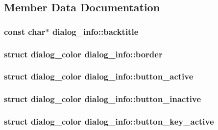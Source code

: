 \subsection{Member Data Documentation}
\hypertarget{structdialog__info_a9f1a0fbe65d687a77b55de0838aded99}{
\subsubsection[{backtitle}]{\setlength{\rightskip}{0pt plus 5cm}const char$\ast$ dialog\-\_\-info\-::backtitle}}\label{structdialog__info_a9f1a0fbe65d687a77b55de0838aded99}
\hypertarget{structdialog__info_a4d23511fa929b3c50042cce4044a56ed}{
\subsubsection[{border}]{\setlength{\rightskip}{0pt plus 5cm}struct {\bf dialog\-\_\-color} dialog\-\_\-info\-::border}}\label{structdialog__info_a4d23511fa929b3c50042cce4044a56ed}
\hypertarget{structdialog__info_afbdc441019b4745607c4fbca304b69f4}{
\subsubsection[{button\-\_\-active}]{\setlength{\rightskip}{0pt plus 5cm}struct {\bf dialog\-\_\-color} dialog\-\_\-info\-::button\-\_\-active}}\label{structdialog__info_afbdc441019b4745607c4fbca304b69f4}
\hypertarget{structdialog__info_a93ea9a7c783c4b085247fd774381ef8c}{
\subsubsection[{button\-\_\-inactive}]{\setlength{\rightskip}{0pt plus 5cm}struct {\bf dialog\-\_\-color} dialog\-\_\-info\-::button\-\_\-inactive}}\label{structdialog__info_a93ea9a7c783c4b085247fd774381ef8c}
\hypertarget{structdialog__info_a29a8048b71e75c643b8d504a45337ba6}{
\subsubsection[{button\-\_\-key\-\_\-active}]{\setlength{\rightskip}{0pt plus 5cm}struct {\bf dialog\-\_\-color} dialog\-\_\-info\-::button\-\_\-key\-\_\-active}}\label{structdialog__info_a29a8048b71e75c643b8d504a45337ba6}
